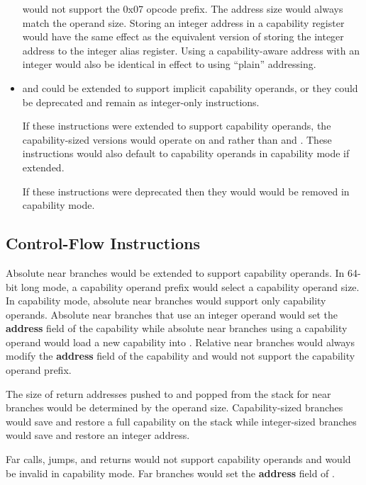 \begin{itemize}
     would not support the 0x07 opcode prefix.  The
    address size would always match the operand size.  Storing an
    integer address in a capability register would have the same
    effect as the equivalent version of  storing the
    integer address to the integer alias register.  Using a
    capability-aware address with an integer  would
    also be identical in effect to using ``plain'' addressing.

  \item {} and  could be extended to
    support implicit capability operands, or they could be deprecated
    and remain as integer-only instructions.

    If these instructions were extended to support capability
    operands, the capability-sized versions would operate on \CSP{}
    and \CBP{} rather than \RSP{} and \RBP{}.  These instructions
    would also default to capability operands in capability mode
    if extended.

    If these instructions were deprecated then they would would be
    removed in capability mode.
\end{itemize}

\subsection{Control-Flow Instructions}

Absolute near branches would be extended to support capability operands.
In 64-bit long mode, a capability operand prefix would select a
capability operand size.  In capability mode, absolute near branches would
support only capability operands.
Absolute near branches that use an integer operand would set the
\textbf{address} field of the
\CIP{} capability while absolute near branches using a capability operand would
load a new capability into \CIP{}.
Relative near branches would always modify the \textbf{address} field of the \CIP{}
capability and would not support the capability operand prefix.

The size of return addresses pushed to and popped from the
stack for near branches would be determined by the operand size.
Capability-sized branches would save and restore a full capability on
the stack while integer-sized branches would save and restore an
integer address.

Far calls, jumps, and returns would not support capability operands
and would be invalid in capability mode.
Far branches would
set the \textbf{address} field of \CIP{}.

